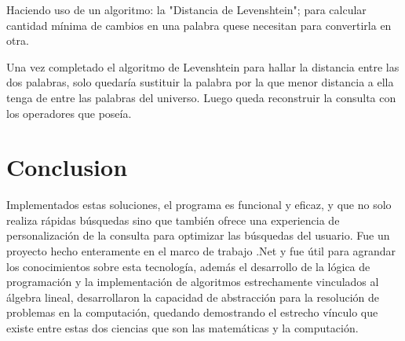 \documentclass[10pt]{article}
\begin{document}
Haciendo uso de un algoritmo: la "Distancia de Levenshtein"; para calcular cantidad mínima de cambios en una palabra quese necesitan para convertirla en otra.

Una vez completado el algoritmo de Levenshtein para hallar la distancia entre las dos palabras, solo quedaría sustituir la palabra por la que menor distancia a ella tenga de entre las palabras del universo. Luego queda reconstruir la consulta con los operadores que poseía.

\section{Conclusion}
\label{sec:end}

Implementados estas soluciones, el programa es funcional y eficaz, y que no solo realiza rápidas búsquedas sino que también ofrece una experiencia de personalización de la consulta para optimizar las búsquedas del usuario. Fue un proyecto hecho enteramente en el marco de trabajo .Net y fue útil para agrandar los conocimientos sobre esta tecnología, además el desarrollo de la lógica de programación y la implementación de algoritmos estrechamente vinculados al álgebra lineal, desarrollaron la capacidad de abstracción para la resolución de problemas en la computación, quedando demostrando el estrecho vínculo que existe entre estas dos ciencias que son las matemáticas y la computación.

\clearpage
\endgroup %
\end{document}

